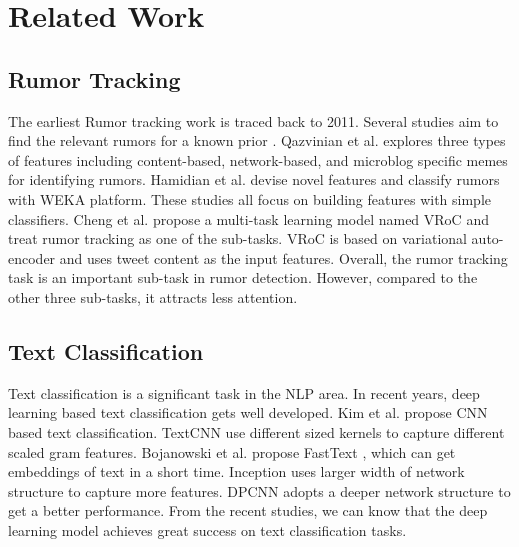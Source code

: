 \section{Related Work}
\label{sec:related}

\subsection{Rumor Tracking}
\label{sec:rumortracking}
The earliest Rumor tracking work is traced back to 2011. Several studies aim to find the relevant rumors for a known prior \cite{DBLP:journals/csur/ZubiagaABLP18}. Qazvinian et al. \cite{DBLP:conf/emnlp/QazvinianRRM11} explores three types of features including content-based, network-based, and microblog specific memes for identifying rumors. Hamidian et al. \cite{DBLP:journals/corr/abs-1912-08926} devise novel features and classify rumors with WEKA platform. These studies all focus on building features with simple classifiers. Cheng et al. \cite{DBLP:conf/www/ChengNB20} propose a multi-task learning model named VRoC and treat rumor tracking as one of the sub-tasks. VRoC is based on variational auto-encoder and uses tweet content as the input features. Overall, the rumor tracking task is an important sub-task in rumor detection. However, compared to the other three sub-tasks, it attracts less attention.

\subsection{Text Classification}
\label{sec:textclassification}
Text classification is a significant task in the NLP area. In recent years, deep learning based text classification gets well developed. Kim et al. \cite{DBLP:conf/emnlp/Kim14} propose CNN based text classification. TextCNN use different sized kernels to capture different scaled gram features. Bojanowski et al. propose FastText  \cite{DBLP:journals/tacl/BojanowskiGJM17}, which can get embeddings of text in a short time. Inception \cite{DBLP:journals/corr/SzegedyLJSRAEVR14} uses larger width of network structure to capture more features. DPCNN \cite{DBLP:conf/acl/JohnsonZ17} adopts a deeper network structure to get a better performance. From the recent studies, we can know that the deep learning model achieves great success on text classification tasks.
